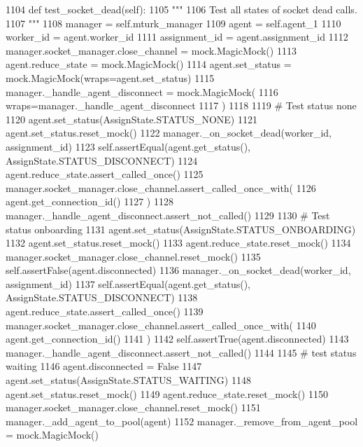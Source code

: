 \begin{DoxyCode}
1104     \textcolor{keyword}{def }test\_socket\_dead(self):
1105         \textcolor{stringliteral}{"""}
1106 \textcolor{stringliteral}{        Test all states of socket dead calls.}
1107 \textcolor{stringliteral}{        """}
1108         manager = self.mturk\_manager
1109         agent = self.agent\_1
1110         worker\_id = agent.worker\_id
1111         assignment\_id = agent.assignment\_id
1112         manager.socket\_manager.close\_channel = mock.MagicMock()
1113         agent.reduce\_state = mock.MagicMock()
1114         agent.set\_status = mock.MagicMock(wraps=agent.set\_status)
1115         manager.\_handle\_agent\_disconnect = mock.MagicMock(
1116             wraps=manager.\_handle\_agent\_disconnect
1117         )
1118 
1119         \textcolor{comment}{# Test status none}
1120         agent.set\_status(AssignState.STATUS\_NONE)
1121         agent.set\_status.reset\_mock()
1122         manager.\_on\_socket\_dead(worker\_id, assignment\_id)
1123         self.assertEqual(agent.get\_status(), AssignState.STATUS\_DISCONNECT)
1124         agent.reduce\_state.assert\_called\_once()
1125         manager.socket\_manager.close\_channel.assert\_called\_once\_with(
1126             agent.get\_connection\_id()
1127         )
1128         manager.\_handle\_agent\_disconnect.assert\_not\_called()
1129 
1130         \textcolor{comment}{# Test status onboarding}
1131         agent.set\_status(AssignState.STATUS\_ONBOARDING)
1132         agent.set\_status.reset\_mock()
1133         agent.reduce\_state.reset\_mock()
1134         manager.socket\_manager.close\_channel.reset\_mock()
1135         self.assertFalse(agent.disconnected)
1136         manager.\_on\_socket\_dead(worker\_id, assignment\_id)
1137         self.assertEqual(agent.get\_status(), AssignState.STATUS\_DISCONNECT)
1138         agent.reduce\_state.assert\_called\_once()
1139         manager.socket\_manager.close\_channel.assert\_called\_once\_with(
1140             agent.get\_connection\_id()
1141         )
1142         self.assertTrue(agent.disconnected)
1143         manager.\_handle\_agent\_disconnect.assert\_not\_called()
1144 
1145         \textcolor{comment}{# test status waiting}
1146         agent.disconnected = \textcolor{keyword}{False}
1147         agent.set\_status(AssignState.STATUS\_WAITING)
1148         agent.set\_status.reset\_mock()
1149         agent.reduce\_state.reset\_mock()
1150         manager.socket\_manager.close\_channel.reset\_mock()
1151         manager.\_add\_agent\_to\_pool(agent)
1152         manager.\_remove\_from\_agent\_pool = mock.MagicMock()

\end{DoxyCode}
